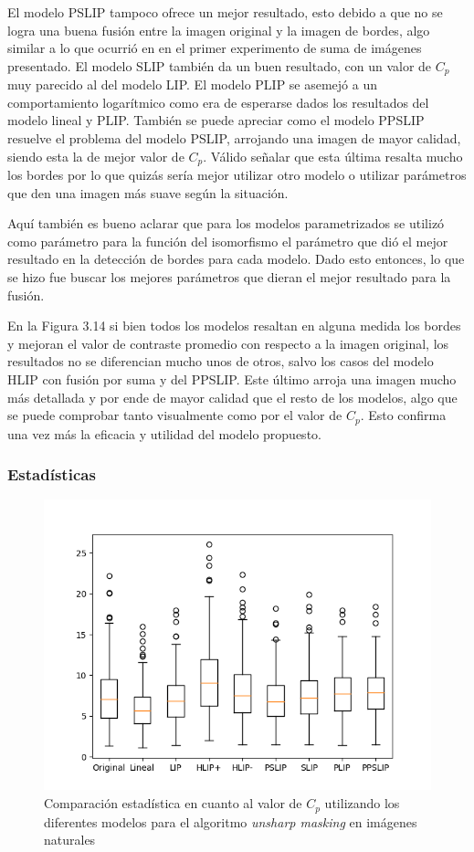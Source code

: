 El modelo PSLIP tampoco ofrece un mejor resultado, esto debido a que no se logra una buena fusi\'on entre la imagen original y la imagen de bordes, algo similar a lo que ocurri\'o en en el primer experimento de suma de im\'agenes presentado. El modelo SLIP tambi\'en da un buen resultado, con un valor de $C_p$ muy parecido al del modelo LIP. El modelo PLIP se asemej\'o a un comportamiento logar\'itmico como era de esperarse dados los resultados del modelo lineal y PLIP. Tambi\'en se puede apreciar como el modelo PPSLIP resuelve el problema del modelo PSLIP, arrojando una imagen de mayor calidad, siendo esta la de mejor valor de $C_p$. V\'alido se\~nalar que esta \'ultima resalta mucho los bordes por lo que quiz\'as ser\'ia mejor utilizar otro modelo o utilizar par\'ametros que den una imagen m\'as suave seg\'un la situaci\'on.

Aqu\'i tambi\'en es bueno aclarar que para los modelos parametrizados se utiliz\'o como par\'ametro para la funci\'on del isomorfismo el par\'ametro que di\'o el mejor resultado en la detecci\'on de bordes para cada modelo. Dado esto entonces, lo que se hizo fue buscar los mejores par\'ametros que dieran el mejor resultado para la fusi\'on.

En la Figura 3.14 si bien todos los modelos resaltan en alguna medida los bordes y mejoran el valor de contraste promedio con respecto a la imagen original, los resultados no se diferencian mucho unos de otros, salvo los casos del modelo HLIP con fusi\'on por suma y del PPSLIP. Este \'ultimo arroja una imagen mucho m\'as detallada y por ende de mayor calidad que el resto de los modelos, algo que se puede comprobar tanto visualmente como por el valor de $C_p$. Esto confirma una vez m\'as la eficacia y utilidad del modelo propuesto.

\subsubsection{Estad\'isticas}

\begin{figure}
	\begin{center}
		\includegraphics[width=10.0 cm]{images/graphics/natural/unsharp_masking/um_all.png}
		\caption{Comparaci\'on estad\'istica en cuanto al valor de $C_p$ utilizando los diferentes modelos para el algoritmo \textit{unsharp masking} en im\'agenes naturales}
	\end{center}
\end{figure}

